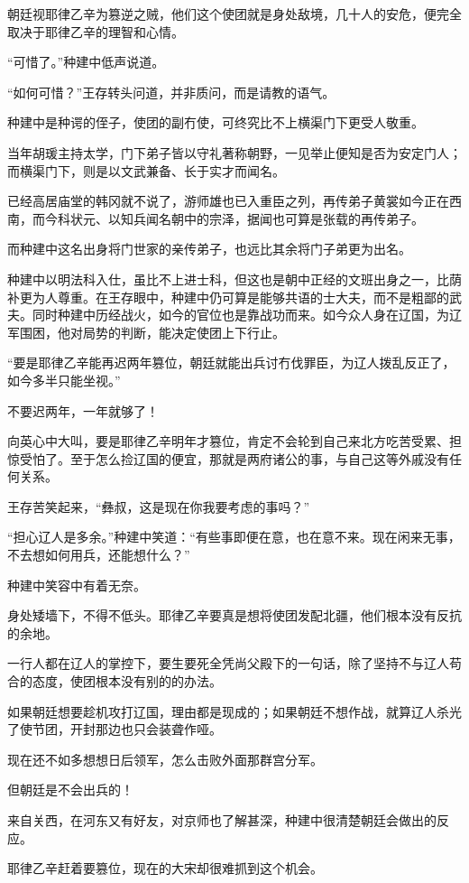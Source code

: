 朝廷视耶律乙辛为篡逆之贼，他们这个使团就是身处敌境，几十人的安危，便完全取决于耶律乙辛的理智和心情。

“可惜了。”种建中低声说道。

“如何可惜？”王存转头问道，并非质问，而是请教的语气。

种建中是种谔的侄子，使团的副冇使，可终究比不上横渠门下更受人敬重。

当年胡瑗主持太学，门下弟子皆以守礼著称朝野，一见举止便知是否为安定门人；而横渠门下，则是以文武兼备、长于实才而闻名。

已经高居庙堂的韩冈就不说了，游师雄也已入重臣之列，再传弟子黄裳如今正在西南，而今科状元、以知兵闻名朝中的宗泽，据闻也可算是张载的再传弟子。

而种建中这名出身将门世家的亲传弟子，也远比其余将门子弟更为出名。

种建中以明法科入仕，虽比不上进士科，但这也是朝中正经的文班出身之一，比荫补更为人尊重。在王存眼中，种建中仍可算是能够共语的士大夫，而不是粗鄙的武夫。同时种建中历经战火，如今的官位也是靠战功而来。如今众人身在辽国，为辽军围困，他对局势的判断，能决定使团上下行止。

“要是耶律乙辛能再迟两年篡位，朝廷就能出兵讨冇伐罪臣，为辽人拨乱反正了，如今多半只能坐视。”

不要迟两年，一年就够了！

向英心中大叫，要是耶律乙辛明年才篡位，肯定不会轮到自己来北方吃苦受累、担惊受怕了。至于怎么捡辽国的便宜，那就是两府诸公的事，与自己这等外戚没有任何关系。

王存苦笑起来，“彝叔，这是现在你我要考虑的事吗？”

“担心辽人是多余。”种建中笑道：“有些事即便在意，也在意不来。现在闲来无事，不去想如何用兵，还能想什么？”

种建中笑容中有着无奈。

身处矮墙下，不得不低头。耶律乙辛要真是想将使团发配北疆，他们根本没有反抗的余地。

一行人都在辽人的掌控下，要生要死全凭尚父殿下的一句话，除了坚持不与辽人苟合的态度，使团根本没有别的的办法。

如果朝廷想要趁机攻打辽国，理由都是现成的；如果朝廷不想作战，就算辽人杀光了使节团，开封那边也只会装聋作哑。

现在还不如多想想日后领军，怎么击败外面那群宫分军。

但朝廷是不会出兵的！

来自关西，在河东又有好友，对京师也了解甚深，种建中很清楚朝廷会做出的反应。

耶律乙辛赶着要篡位，现在的大宋却很难抓到这个机会。

